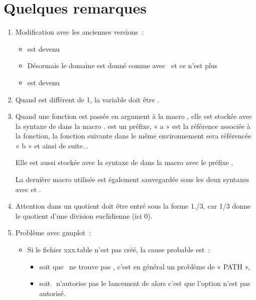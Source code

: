 \section{Quelques remarques}

\begin{enumerate}
\item Modification avec les anciennes versions~:
  \begin{itemize}
   \item {} est devenu 
   \item Désormais le domaine est donné comme avec \TIKZ\ et ce n'est plus
   \item {} est devenu 
  \end{itemize}

\item  Quand  est différent de 1, la variable doit être .
\item Quand une fonction est passée en argument à la macro , elle est stockée avec la syntaxe de  dans la macro .  est un préfixe, « a » est la référence associée à la fonction, la fonction suivante dans le même environnement  sera référencée « b » et ainsi de suite...

Elle est aussi stockée avec la syntaxe de  dans la macro   avec le préfixe .

La dernière macro utilisée est également sauvegardée sous les deux syntaxes  avec    et .
\item Attention dans  un quotient doit être entré sous la forme 1./3, car 1/3 donne le quotient d'une division euclidienne (ici 0).
\item Problème avec gnuplot~:
  \begin{itemize}
   \item Si le fichier xxx.table n'est pas créé, la cause probable est~:
     \begin{itemize}
     \item  soit que \TEX\ ne trouve pas , c'est en général un problème de « PATH »,
     \item  soit \TEX\  n'autorise pas le lancement de  alors c'est que l'option  n'est pas autorisé. 
    \end{itemize} 
 

\end{itemize}
\end{enumerate}
